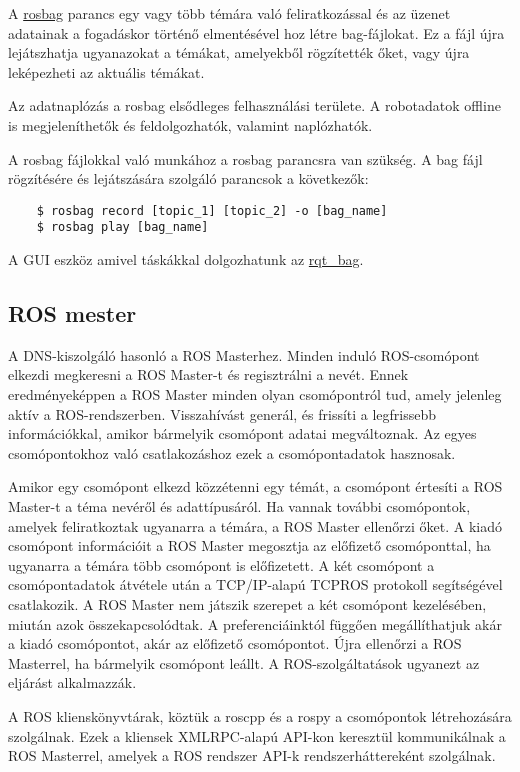 \documentclass{article}
\begin{document}
A \href{http://wiki.ros.org/rosbag/Commandline}{rosbag} parancs egy vagy több témára való feliratkozással és az üzenet adatainak a fogadáskor történő elmentésével hoz létre bag-fájlokat. Ez a fájl újra lejátszhatja ugyanazokat a témákat, amelyekből rögzítették őket, vagy újra leképezheti az aktuális témákat.

Az adatnaplózás a rosbag elsődleges felhasználási területe. A robotadatok offline is megjeleníthetők és feldolgozhatók, valamint naplózhatók.

A rosbag fájlokkal való munkához a rosbag parancsra van szükség. A bag fájl rögzítésére és lejátszására szolgáló parancsok a következők:
\begin{verbatim}
    $ rosbag record [topic_1] [topic_2] -o [bag_name]
    $ rosbag play [bag_name]
\end{verbatim}
A GUI eszköz amivel táskákkal dolgozhatunk az \href{http://wiki.ros.org/rqt_bag}{rqt\_bag}.

\subsection{ROS mester}
A DNS-kiszolgáló hasonló a ROS Masterhez. Minden induló ROS-csomópont elkezdi megkeresni a ROS Master-t és regisztrálni a nevét. Ennek eredményeképpen a ROS Master minden olyan csomópontról tud, amely jelenleg aktív a ROS-rendszerben. Visszahívást generál, és frissíti a legfrissebb információkkal, amikor bármelyik csomópont adatai megváltoznak. Az egyes csomópontokhoz való csatlakozáshoz ezek a csomópontadatok hasznosak.

Amikor egy csomópont elkezd közzétenni egy témát, a csomópont értesíti a ROS Master-t a téma nevéről és adattípusáról. Ha vannak további csomópontok, amelyek feliratkoztak ugyanarra a témára, a ROS Master ellenőrzi őket. A kiadó csomópont információit a ROS Master megosztja az előfizető csomóponttal, ha ugyanarra a témára több csomópont is előfizetett. A két csomópont a csomópontadatok átvétele után a TCP/IP-alapú TCPROS protokoll segítségével csatlakozik. A ROS Master nem játszik szerepet a két csomópont kezelésében, miután azok összekapcsolódtak. A preferenciáinktól függően megállíthatjuk akár a kiadó csomópontot, akár az előfizető csomópontot. Újra ellenőrzi a ROS Masterrel, ha bármelyik csomópont leállt. A ROS-szolgáltatások ugyanezt az eljárást alkalmazzák.

A ROS klienskönyvtárak, köztük a roscpp és a rospy a csomópontok létrehozására szolgálnak. Ezek a kliensek XMLRPC-alapú API-kon keresztül kommunikálnak a ROS Masterrel, amelyek a ROS rendszer API-k rendszerháttereként szolgálnak.
\end{document}
